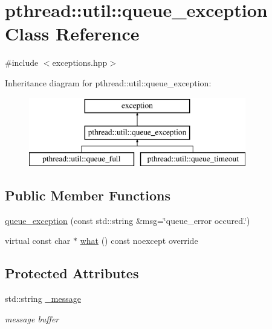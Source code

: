 \hypertarget{classpthread_1_1util_1_1queue__exception}{}\section{pthread\+:\+:util\+:\+:queue\+\_\+exception Class Reference}
\label{classpthread_1_1util_1_1queue__exception}


{\ttfamily \#include $<$exceptions.\+hpp$>$}

Inheritance diagram for pthread\+:\+:util\+:\+:queue\+\_\+exception\+:\begin{figure}[H]
\begin{center}
\leavevmode
\includegraphics[height=3.000000cm]{classpthread_1_1util_1_1queue__exception}
\end{center}
\end{figure}
\subsection*{Public Member Functions}
\begin{DoxyCompactItemize}
\item 
\hyperlink{classpthread_1_1util_1_1queue__exception_abdae10e09e6f7cb24f64f0aee107590c}{queue\+\_\+exception} (const std\+::string \&msg=\char`\"{}queue\+\_\+error occured.\char`\"{})
\item 
virtual const char $\ast$ \hyperlink{classpthread_1_1util_1_1queue__exception_a41cf42358ff05d8df966713d3f2c64b3}{what} () const  noexcept override
\end{DoxyCompactItemize}
\subsection*{Protected Attributes}
\begin{DoxyCompactItemize}
\item 
std\+::string \hyperlink{classpthread_1_1util_1_1queue__exception_a16e98607fa8cdcbd76e16f8965db533e}{\+\_\+message}\hypertarget{classpthread_1_1util_1_1queue__exception_a16e98607fa8cdcbd76e16f8965db533e}{}\label{classpthread_1_1util_1_1queue__exception_a16e98607fa8cdcbd76e16f8965db533e}

\begin{DoxyCompactList}\small\item\em message buffer \end{DoxyCompactList}\end{DoxyCompactItemize}


